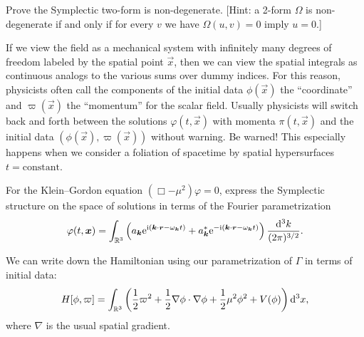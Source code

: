 \begin{exercise}
Prove the Symplectic two-form is non-degenerate.
[Hint: a 2-form $\Omega$ is non-degenerate if and only if
for every $v$ we have $\Omega(u,v)=0$ imply $u=0$.]
\end{exercise}

\begin{ddanger}
If we view the field as a mechanical system with infinitely many degrees
of freedom labeled by the spatial point $\vec{x}$, then we can view the
spatial integrals as continuous analogs to the various sums over dummy
indices. For this reason, physicists often call the components of the
initial data $\phi(\vec{x})$ the ``coordinate'' and $\varpi(\vec{x})$
the ``momentum'' for the scalar field. Usually physicists will switch
back and forth between the solutions $\varphi(t,\vec{x})$ with momenta
$\pi(t,\vec{x})$ and the initial data $(\phi(\vec{x}),\varpi(\vec{x}))$
without warning. Be warned! This especially happens when we consider a
foliation of spacetime by spatial hypersurfaces $t=\mbox{constant}$.
\end{ddanger}

\begin{exercise}
For the Klein--Gordon equation $(\Box-\mu^{2})\varphi=0$, express the
Symplectic structure on the space of solutions in terms of the Fourier
parametrization
\begin{equation}
\varphi(t,\boldsymbol{x}) =
\int_{\mathbb{R}^{3}}\left(a_{\boldsymbol{k}}\mathrm{e}^{\mathrm{i}(\boldsymbol{k}\cdot\boldsymbol{r}-\omega_{\boldsymbol{k}}t)}
+ a_{\boldsymbol{k}}^{*}\mathrm{e}^{-\mathrm{i}(\boldsymbol{k}\cdot\boldsymbol{r}-\omega_{\boldsymbol{k}}t)}
\right)\frac{\mathrm{d}^{3}k}{(2\pi)^{3/2}}.
\end{equation}
\end{exercise}

We can write down the Hamiltonian using our parametrization of $\Gamma$
in terms of initial data:
\begin{equation}
H[\phi,\varpi] = \int_{\mathbb{R}^{3}}\left(\frac{1}{2}\varpi^{2} + \frac{1}{2}\nabla\phi\cdot\nabla\phi
+\frac{1}{2}\mu^{2}\phi^{2}+V(\phi)\right)\mathrm{d}^{3}x,
\end{equation}
where $\nabla$ is the usual spatial gradient.

